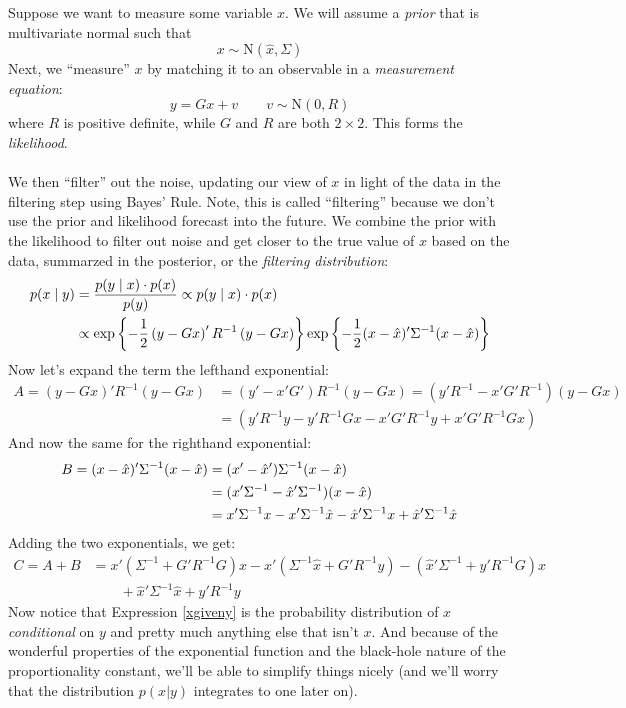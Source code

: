 \documentclass[a4paper,12pt]{scrartcl}
\begin{document}
Suppose we want to measure some variable $x$. We will 
assume a \emph{prior} that is multivariate normal such that
    \[ x \sim \text{N}(\hat{x}, \Sigma) \]
Next, we ``measure'' $x$ by matching it to an observable in
a \emph{measurement equation}:
    \[ y = G x + v \qquad v\sim \text{N}(0, R) \]
where $R$ is positive definite, while $G$ and $R$ are both 
$2 \times 2$. This forms the \emph{likelihood}.
\\
\\
We then ``filter'' out the noise, updating our view of $x$ in
light of the data in the filtering step using Bayes' Rule.
Note, this is called ``filtering'' because we don't use the prior
and likelihood forecast into
the future. We combine the prior with the likelihood to filter
out noise and get closer to the true value of $x$ based on
the data, summarzed in the posterior, or the
\emph{filtering distribution}:
\begin{align}
    p(x \; | \; y) &= \frac{p(y \; | \; x) \cdot p(x)}{p(y)} 
    \propto p(y \; | \; x) \cdot p(x) \label{xgiveny} \\
    &\propto \exp\left\{-\frac{1}{2}
	\left( y - Gx \right)' R^{-1} \left(y-Gx\right)
	\right\} \exp\left\{-\frac{1}{2}( x - \hat{x} )' 
	\Sigma^{-1} (x-\hat{x})\right\} \notag
\end{align}
Now let's expand the term the lefthand exponential:
\begin{align*}
    A = \left( y - Gx \right)' R^{-1} \left(y-Gx\right) &= 
	\left( y' - x'G' \right) R^{-1} \left(y-Gx\right) 
    = \left( y'R^{-1} - x'G'R^{-1} \right)  \left(y-Gx\right) \\
    &= \left( y'R^{-1}y - y'R^{-1} Gx - x'G'R^{-1} y 
	+ x'G'R^{-1} Gx\right)
\end{align*}
And now the same for the righthand exponential:
\begin{align}
     B = ( x - \hat{x} )' \Sigma^{-1} (x-\hat{x}) 
	&= ( x' - \hat{x}' ) \Sigma^{-1} (x-\hat{x}) \notag\\
    &=  (x'\Sigma^{-1} - \hat{x}'\Sigma^{-1})   
	(x-\hat{x}) \notag \\
    &=  x'\Sigma^{-1} x - x'\Sigma^{-1} \hat{x} - 
	\hat{x}'\Sigma^{-1} x
	+ \hat{x}'\Sigma^{-1} \hat{x} \label{B}
\end{align}
Adding the two exponentials, we get:
\begin{align*}
    C = A + B &= x' \left( \Sigma^{-1} + G'R^{-1}G\right) x 
	- x' (\Sigma^{-1} \hat{x} + G'R^{-1}y)
	- (\hat{x}' \Sigma^{-1} + y' R^{-1}G) x  \\
	& \qquad + \hat{x}' \Sigma^{-1} \hat{x} + y' R^{-1} y 
\end{align*}
Now notice that Expression \ref{xgiveny} is the probability
distribution of $x$ \emph{conditional} on $y$ and pretty
much anything else that isn't $x$.  And because of the
wonderful properties of the exponential function and the
black-hole nature of the proportionality constant, we'll be
able to simplify things nicely (and we'll worry that the
distribution $p(x|y)$ integrates to one later on).  
\end{document}
